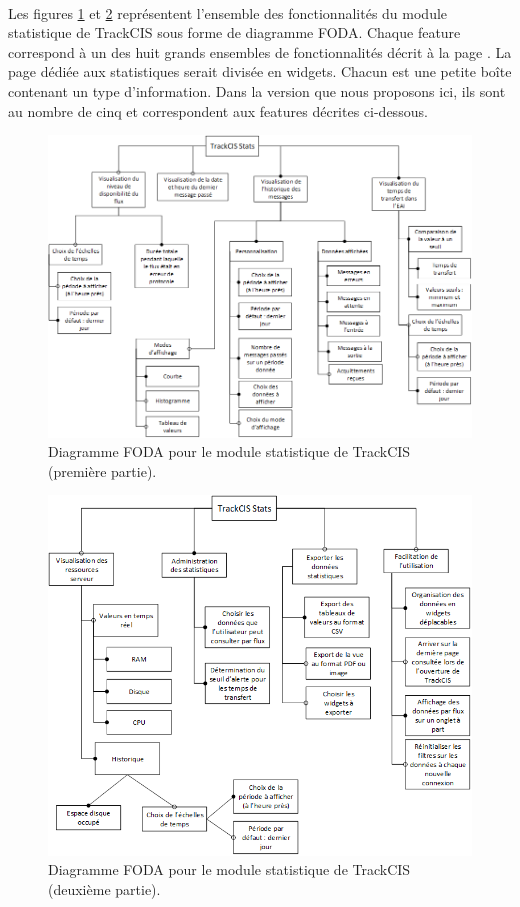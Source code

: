			\paragraph{}
			Les figures \ref{foda_1} et \ref{foda_2} représentent l'ensemble des
			fonctionnalités du module statistique de TrackCIS sous forme de diagramme FODA.
			Chaque feature correspond à un des huit grands ensembles de fonctionnalités
			décrit à la page \pageref{ensembles_fonctios}.\newline
			La page dédiée aux statistiques serait divisée en widgets. Chacun est une
			petite boîte contenant un type d'information. Dans la version que nous
			proposons ici, ils sont au nombre de cinq et correspondent aux features
			décrites ci-dessous.
			\begin{figure}[H]%
				\centering
				\includegraphics[width=16cm]{../img/part2/foda_1.png}
				\caption{\label{foda_1} Diagramme FODA pour le module statistique de
				TrackCIS (première partie).}
			\end{figure}
			\begin{figure}[H]%
				\centering
				\includegraphics[width=16cm]{../img/part2/foda_2.png}
				\caption{\label{foda_2} Diagramme FODA pour le module statistique de
				TrackCIS (deuxième partie).}
			\end{figure}
			
